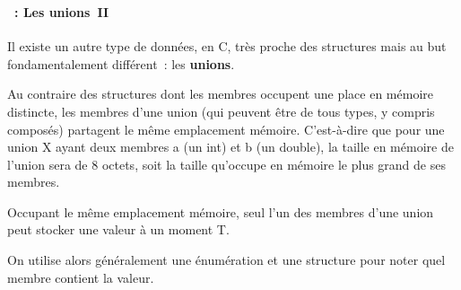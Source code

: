 \begin{frame}
  \frametitle{\secname}
  \framesubtitle{\subsecname~: Les unions~II}

  Il existe un autre type de données, en C, très proche des structures mais au but fondamentalement différent~: 
  les \textbf{unions}.
  \vspace{0.3cm}
  \par
  Au contraire des structures dont les membres occupent une place en mémoire distincte, les membres d'une union 
  (qui peuvent être de tous types, y compris composés) partagent le même emplacement mémoire. 
  C'est-à-dire que pour une union X ayant deux membres a (un int) et b (un double), la taille en mémoire de 
  l'union sera de 8 octets, soit la taille qu'occupe en mémoire le plus grand de ses membres.
  \vspace{0.3cm}
  \par
  Occupant le même emplacement mémoire, seul l'un des membres d'une union peut stocker une valeur à un moment T.
  \par
  On utilise alors généralement une énumération et une structure pour noter quel membre contient la valeur.
\end{frame}

